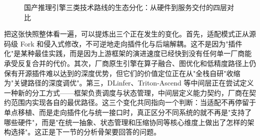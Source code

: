\begin{figure}[!htb]
\centering
\resizebox{0.90\linewidth}{!}{}
\caption{国产推理引擎三类技术路线的生态分化：从硬件到服务交付的四层对比}
\label{fig:ecosystem-route-map}
\end{figure}

把这张快照整体看一遍，可以提炼出三个正在发生的变化。首先，适配模式正从源码级 Fork 和侵入式修改，不可逆地走向插件化与后端解耦。这不是因为"插件化"是某种最佳实践，而是因为上游框架的演进速度已经快到没有任何单一厂商能承受反复合并的代价。其次，厂商原生引擎在算子融合、图优化和低精度路径上仍保有开源插件难以达到的深度优势，但它们的价值定位正在从"全栈自研"收缩为"关键路径的深度调优"。第三，DLinfer、Triton-Ascend 等中间层正在尝试定义一种新的分工方式——框架负责调度与状态管理，中间层定义能力契约，厂商在契约范围内实现各自的最优路径。这三个变化共同指向一个判断：当适配不再停留于单点移植、而是走向插件化与统一接口时，真正区分不同系统的就不再是"支持了哪些硬件"，而是"在统一抽象、状态管理和压缩协同等核心维度上做出了怎样的架构选择"。这正是下一节的分析骨架要回答的问题。
